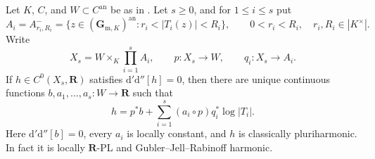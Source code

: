 \begin{theorem}
\label{thm:p062-open-polyannulus-products-over-curves}
Let \(K\), \(C\), and \(W\subset C^{\mathrm{an}}\) be as in
.  Let \(s\geq0\), and for
\(1\leq i\leq s\) put
\[
 A_i=A^-_{r_i,R_i}
 =\{z\in(\mathbf G_{\mathrm m,K})^{\mathrm{an}}:
                  r_i<|T_i(z)|<R_i\},
 \qquad 0<r_i<R_i,\quad r_i,R_i\in|K^\times|.
\]
Write
\[
 X_s=W\times_K\prod_{i=1}^sA_i,
 \qquad p:X_s\longrightarrow W,
 \qquad q_i:X_s\longrightarrow A_i.
\]
If \(h\in C^0(X_s,\mathbf R)\) satisfies
\(\mathrm d'\mathrm d''[h]=0\), then there are unique continuous functions
\(b,a_1,\ldots,a_s:W\to\mathbf R\) such that
\[
 h=p^*b+\sum_{i=1}^s(a_i\circ p)q_i^*\log|T_i|.
\tag{\(\heartsuit\)}\label{eq:p062-open-polyannulus-curve-formula}
\]
Here \(\mathrm d'\mathrm d''[b]=0\), every \(a_i\) is locally constant,
and \(h\) is classically pluriharmonic.  In fact it is locally
\(\mathbf R\)-PL and Gubler--Jell--Rabinoff harmonic.
\end{theorem}
